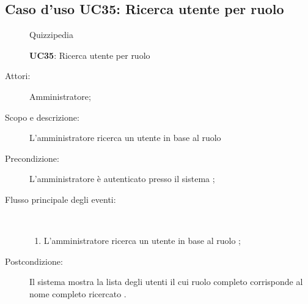 \subsection{Caso d'uso UC35: Ricerca utente per ruolo}
	\begin{figure}[H]
		\centering
		\begin{resizedtikzpicture}{\textwidth}
		\begin{umlsystem}[x=0, fill=lightgray!20]{Quizzipedia}
		\end{umlsystem}
		\end{resizedtikzpicture}
		\caption{\textbf{UC35}: Ricerca utente per ruolo}
		\label{UC35}
	\end{figure}
\begin{description}
\item[Attori:] Amministratore;
\item[Scopo e descrizione:] L'amministratore ricerca un utente in base al ruolo 

      \item[Precondizione:] L'amministratore è autenticato presso il sistema
;

        \item[Flusso principale degli eventi:] \ 
 \begin{enumerate}
          \item L'amministratore ricerca un utente in base al ruolo 
;

      \end{enumerate}
    \item[Postcondizione:] Il sistema mostra la lista degli utenti il cui ruolo completo corrisponde al nome completo ricercato
.
  \end{description}
 